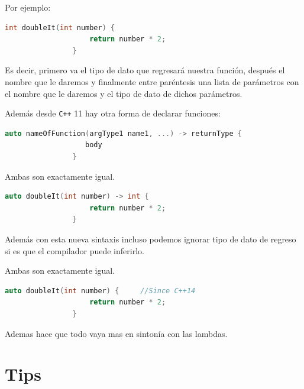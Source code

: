\documentclass[12pt, fleqn]{report}                             %
\theoremstyle{break}                                            %
\newcommand{\textCode}[1]  { \texttt{#1} }                      %
\newcommand{\Cpp}{\ignorespaces\textCode{C++}}                  %
\begin{document}
            Por ejemplo:
            \begin{lstlisting}[language=C++, gobble=16]
                int doubleIt(int number) {
                    return number * 2;
                }
            \end{lstlisting}

            Es decir, primero va el tipo de dato que regresará nuestra función, después el nombre que le
            daremos y finalmente entre paréntesis una lista de parámetros con el nombre que le daremos y el
            tipo de dato de dichos parámetros.

            Además desde \Cpp 11 hay otra forma de declarar funciones:
            \begin{lstlisting}[language=C++, gobble=16]
                auto nameOfFunction(argType1 name1, ...) -> returnType {
                   body
                }
            \end{lstlisting}

            Ambas son exactamente igual.
            \begin{lstlisting}[language=C++, gobble=16]
                auto doubleIt(int number) -> int {
                    return number * 2;
                }
            \end{lstlisting}

            Además con esta nueva sintaxis incluso podemos ignorar tipo de dato de regreso si es que el
            compilador puede inferirlo.

            Ambas son exactamente igual.
            \begin{lstlisting}[language=C++, gobble=16]
                auto doubleIt(int number) {     //Since C++14
                    return number * 2;
                }
            \end{lstlisting}

            Ademas hace que todo vaya mas en sintonía con las lambdas.

            \clearpage
            \section{Tips}
\end{document}
